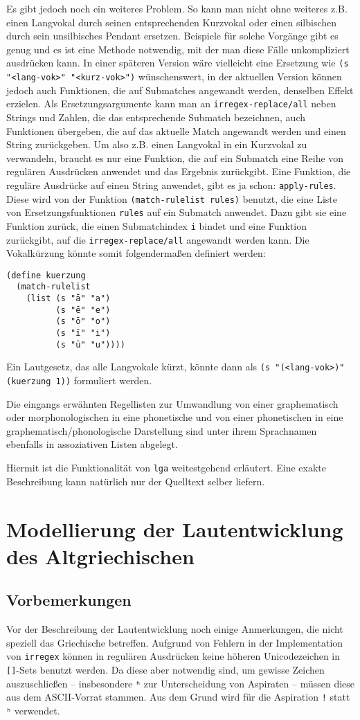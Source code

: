 \documentclass[12pt,a4paper,normalheadings]{scrartcl}
\def\tt#1{\texttt{#1}}
\begin{document}
Es gibt jedoch noch ein weiteres Problem.
So kann man nicht ohne weiteres z.B. einen Langvokal durch seinen
entsprechenden Kurzvokal oder einen silbischen durch sein unsilbisches
Pendant ersetzen.
Beispiele für solche Vorgänge gibt es genug und es ist eine Methode notwendig,
mit der man diese Fälle unkompliziert ausdrücken kann.
In einer späteren Version wäre vielleicht eine Ersetzung wie
\tt{(s "<lang-vok>" "<kurz-vok>")} wünschenswert,
in der aktuellen Version können jedoch auch Funktionen,
die auf Submatches angewandt werden, denselben Effekt erzielen.
Als Ersetzungsargumente kann man an \tt{irregex-replace/all}
neben Strings und Zahlen, die das entsprechende Submatch bezeichnen,
auch Funktionen übergeben,
die auf das aktuelle Match angewandt werden und einen String zurückgeben.
Um also z.B. einen Langvokal in ein Kurzvokal zu verwandeln,
braucht es nur eine Funktion,
die auf ein Submatch eine Reihe von regulären Ausdrücken anwendet
und das Ergebnis zurückgibt.
Eine Funktion, die reguläre Ausdrücke auf einen String anwendet,
gibt es ja schon: \tt{apply-rules}.
Diese wird von der Funktion \tt{(match-rulelist rules)} benutzt,
die eine Liste von Ersetzungsfunktionen \tt{rules}
auf ein Submatch anwendet.
Dazu gibt sie eine Funktion zurück,
die einen Submatchindex \tt{i} bindet und eine Funktion zurückgibt,
auf die \tt{irregex-replace/all} angewandt werden kann.
Die Vokalkürzung könnte somit folgendermaßen definiert werden:
\begin{verbatim}
(define kuerzung
  (match-rulelist
    (list (s "ā" "a")
          (s "ē" "e")
          (s "ō" "o")
          (s "ī" "i")
          (s "ū" "u"))))
\end{verbatim}
Ein Lautgesetz, das alle Langvokale kürzt,
könnte dann als \tt{(s "(<lang-vok>)" (kuerzung 1))} formuliert werden.

Die eingangs erwähnten Regellisten zur Umwandlung von einer
graphematisch oder morphonologischen in eine phonetische und von
einer phonetischen in eine graphematisch/phonologische Darstellung
sind unter ihrem Sprachnamen ebenfalls in
assoziativen Listen abgelegt.

Hiermit ist die Funktionalität von \tt{lga} weitestgehend erläutert.
Eine exakte Beschreibung kann natürlich nur der Quelltext selber liefern.

\section{Modellierung der Lautentwicklung des Altgriechischen}
\subsection{Vorbemerkungen}
\label{sec:vorbemerkungen}
Vor der Beschreibung der Lautentwicklung noch einige Anmerkungen,
die nicht speziell das Griechische betreffen.
Aufgrund von Fehlern in der Implementation von \tt{irregex}
können in regulären Ausdrücken keine höheren Unicodezeichen
in \tt{[]}-Sets benutzt werden.
Da diese aber notwendig sind, um gewisse Zeichen auszuschließen
-- insbesondere \tt{ʰ} zur Unterscheidung von Aspiraten --
müssen diese aus dem ASCII-Vorrat stammen.
Aus dem Grund wird für die Aspiration \tt{!} statt \tt{ʰ} verwendet.
\end{document}
